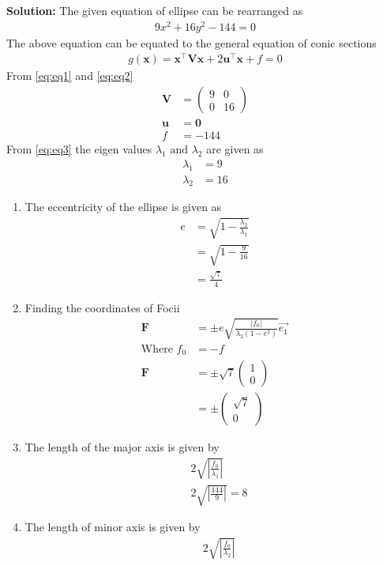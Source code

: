 \documentclass[12pt]{article}
\providecommand{\brak}[1]{\ensuremath{\left(#1\right)}}
\providecommand{\abs}[1]{\left\vert#1\right\vert}
\newcommand{\solution}{\noindent \textbf{Solution: }}
\newcommand{\myvec}[1]{\ensuremath{\begin{pmatrix}#1\end{pmatrix}}}
\let\vec\mathbf
\begin{document}
\begin{enumerate}
\solution
The given equation of ellipse can be rearranged as 
\begin{align}
 9x^2+16y^2-144=0\label{eq:eq1}
\end{align}
The above equation can be equated to the general equation of conic sections
\begin{align}
 g\brak{\vec{x}}=\vec{x}^\top \vec{V} \vec{x} + 2\vec{u}^\top \vec{x} + f = 0\label{eq:eq2}
\end{align}
From \eqref{eq:eq1} and \eqref{eq:eq2}
\begin{align}
 \vec{V} &= \myvec{9&0\\0&16}\label{eq:eq3}\\
 \vec{u} &= \vec{0}\\
 f &= -144
\end{align}
From \eqref{eq:eq3} the eigen values $\lambda_1 \text{ and } \lambda_2$ are given as
\begin{align}
 \lambda_1 &= 9\\
 \lambda_2 &= 16
\end{align}
\begin{enumerate}
\item The eccentricity of the ellipse is given as
\begin{align}
 e &= \sqrt{1 - \frac{\lambda_2}{\lambda_1}} \\
          &= \sqrt{1-\frac{9}{16}}\\
   &= \frac{\sqrt{7}}{4}
\end{align}
\item Finding the coordinates of Focii
\begin{align}
 \vec{F} &= \pm e\sqrt{\frac{\abs{f_0}}{\lambda_2\brak{1-e^2}}}\Vec{e_1}\\
\text{Where }f_0 &=-f\\
 \vec{F} &= \pm\sqrt{7}\myvec{1\\0}\\
	&= \pm\myvec{\sqrt{7}\\0}
\end{align}
\item The length of the major axis is given by
\begin{align}
 &2\sqrt{\abs{\frac{f_0}{\lambda_1}}}\\
        &2\sqrt{\abs{\frac{144}{9}}}= 8
\end{align}
\item The length of minor axis is given by
\begin{align}
 &2\sqrt{\abs{\frac{f_0}{\lambda_2}}}\\

\end{align}
\end{enumerate}
\end{enumerate}
\end{document}
